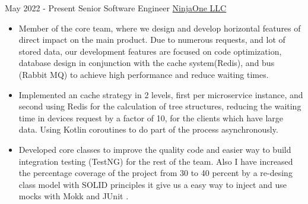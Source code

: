 \documentclass[letterpaper]{twentysecondcv} %
\begin{document}
\begin{twenty} %

\twentyitem
    {May 2022 -}
    {Present}
    {Senior Software Engineer}
    {\href{https://www.ninjaone.com/about-us/}{NinjaOne LLC}}
    {}
    {
        \begin{itemize}
            \item
            Member of the core team, where we design and develop horizontal features of direct impact on the main product. Due to numerous requests, and lot of stored data, our development features are focused on code optimization, database design in conjunction with the cache system(Redis), and bus (Rabbit MQ) to achieve high performance and reduce waiting times.
         \end{itemize}
         
        \begin{itemize}
            \item
            Implemented an cache strategy in 2 levels, first per microservice instance, and second using Redis for the calculation of tree structures, reducing the waiting time in devices request by a factor of 10, for the clients which have large data. Using Kotlin coroutines to do part of the process asynchronously.
         \end{itemize}
         
         
        \begin{itemize}
            \item
            Developed core classes to improve the quality code and easier way to build integration testing (TestNG) for the rest of the team. Also I have increased the percentage coverage of the project from 30 to 40 percent by a re-desing class model with SOLID principles it give us a easy way to inject and use mocks with Mokk and JUnit .
         \end{itemize}
         
    }
    \\
\end{twenty}
\end{document}
